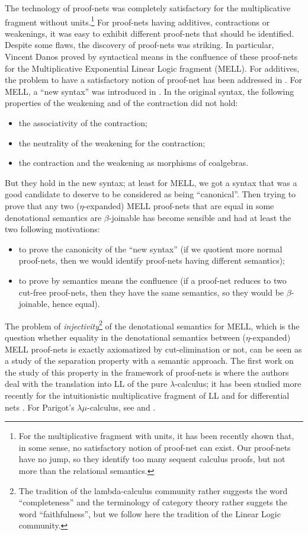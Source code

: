 \documentclass{article}
\theoremstyle{plain}
\begin{document}
The technology of proof-nets was completely satisfactory for the multiplicative fragment without units.\footnote{For the multiplicative fragment with units, it has been recently shown \cite{MLLwithunits} that, in some sense, no satisfactory notion of proof-net can exist. Our proof-nets have no jump, so they identify too many sequent calculus proofs, but not more than the relational semantics.} For proof-nets having additives, contractions or weakenings, it was easy to exhibit different proof-nets that should be identified. Despite some flaws, the discovery of proof-nets was striking. In particular, Vincent Danos proved by syntactical means in \cite{phddanos} the confluence of these proof-nets for the Multiplicative Exponential Linear Logic fragment (MELL). For additives, the problem to have a satisfactory notion of proof-net has been addressed in \cite{mallpn}. For MELL, a ``new syntax'' was introduced in \cite{hilbert}. In the original syntax, the following properties of the weakening and of the contraction did not hold:
\begin{itemize}
\item the associativity of the contraction;
\item the neutrality of the weakening for the contraction;
\item the contraction and the weakening as morphisms of coalgebras.
\end{itemize}
But they hold in the new syntax; at least for MELL, we got a syntax that was a good candidate to deserve to be considered as being ``canonical''. Then trying to prove that any two ($\eta$-expanded) MELL proof-nets that are equal in some denotational semantics are $\beta$-joinable has become sensible and had at least the two following motivations:
\begin{itemize}
\item to prove the canonicity of the ``new syntax'' (if we quotient more normal proof-nets, then we would identify proof-nets having different semantics);
\item to prove by semantics means the confluence (if a proof-net reduces to two cut-free proof-nets, then they have the same semantics, so they would be $\beta$-joinable, hence equal).
\end{itemize}
The problem of \emph{injectivity}\footnote{The tradition of the lambda-calculus community rather suggests the word ``completeness'' and the terminology of category theory rather suggets the word ``faithfulness'', but we follow here the tradition of the Linear Logic community.} of the denotational semantics for MELL, which is the question whether equality in the denotational semantics between ($\eta$-expanded) MELL proof-nets is exactly axiomatized by cut-elimination or not, can be seen as a study of the separation property with a semantic approach. The first work on the study of this property in the framework of proof-nets is \cite{Marco} where the
authors deal with the translation into LL of the pure $\lambda$-calculus; it has been studied more recently for the intuitionistic multiplicative
fragment of LL \cite{typedbohm} and for differential nets \cite{separationdiff}. For Parigot's $\lambda \mu$-calculus, see \cite{lmbohm} and \cite{separationsaurin}.
\end{document}
